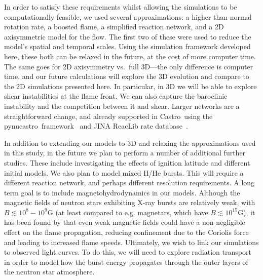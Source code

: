 \documentclass[preprint,times,tighten]{aastex63}
\newcommand{\castro}{{\sf Castro}}
\newcommand{\pynucastro}{{\sf pynucastro}}
\begin{document}
In order to satisfy these requirements whilst allowing the simulations
to be computationally feasible, we used several approximations: a
higher than normal rotation rate, a boosted flame, a simplified
reaction network, and a 2D axisymmetric model for the flow. The first two of
these were used to reduce the model's spatial and temporal
scales. Using the simulation framework developed here, these both can
be relaxed in the future, at the cost of more computer time. The same
goes for 2D axisymmetry vs.\ full 3D---the only difference is computer time, and
our future calculations will explore the 3D evolution and compare to
the 2D simulations presented here. In particular, in 3D we will be
able to explore shear instabilities at the flame front.  We can also
capture the baroclinic instability \citep{Cavecchi2019} and the
competition between it and shear.  Larger networks are a
straightforward change, and already supported in \castro\ using the
\pynucastro\ framework~\citep{pynucastro} and JINA ReacLib rate
database~\citep{reaclib}.


In addition to extending our models to 3D and relaxing the
approximations used in this study, in the future we plan to perform a
number of additional further studies.  These include investigating the
effects of ignition latitude and different initial models. We also
plan to model mixed H/He bursts. This will require a different
reaction network, and perhaps different resolution
requirements. A long term goal is to include magnetohydrodynamics in
our models. Although the magnetic fields of neutron stars exhibiting
X-ray bursts are relatively weak, with $B \lesssim 10^8 - 10^9$G
\citep{mukherjee2015magnetic} (at least compared to e.g. magnetars,
which have $B\lesssim 10^{15}$G), it has been found by
\citet{art-2016-cavecchi-etal} that even weak magnetic fields could
have a non-negligible effect on the flame propagation, reducing
confinement due to the Coriolis force and leading to increased flame
speeds. Ultimately, we wish to link our simulations to observed light
curves. To do this, we will need to explore radiation transport in
order to model how the burst energy propagates through the outer
layers of the neutron star atmosphere.




\end{document}
